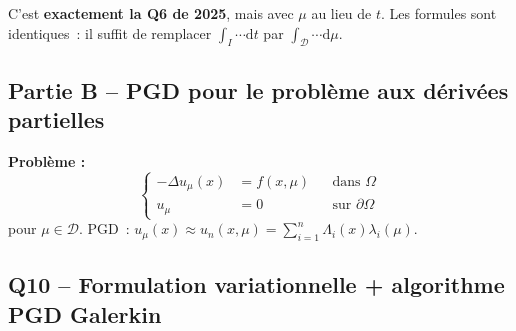 \documentclass[11pt,a4paper]{article}
\begin{document}
\begin{linkbox}
C'est \textbf{exactement la Q6 de 2025}, mais avec $\mu$ au lieu de $t$. Les formules sont identiques~: il suffit de remplacer $\int_I \cdots\mathrm{d}t$ par $\int_\mathcal{D}\cdots\mathrm{d}\mu$.
\end{linkbox}

\subsection{Partie B -- PGD pour le probl\`eme aux d\'eriv\'ees partielles}

\textbf{Probl\`eme :}
\[
\left\{
\begin{aligned}
-\Delta u_\mu(x) &= f(x,\mu) && \text{dans } \Omega \\
u_\mu &= 0 && \text{sur } \partial\Omega
\end{aligned}
\right.
\tag{5-6}
\]
pour $\mu \in \mathcal{D}$. PGD~: $u_\mu(x) \approx u_n(x,\mu) = \sum_{i=1}^{n}\Lambda_i(x)\lambda_i(\mu)$.

\subsection{Q10 -- Formulation variationnelle + algorithme PGD Galerkin}
\end{document}

